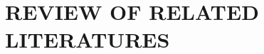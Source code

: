 \documentclass[main]{subfiles}
\begin{document}
\chapter{REVIEW OF RELATED LITERATURES}
\end{document}
